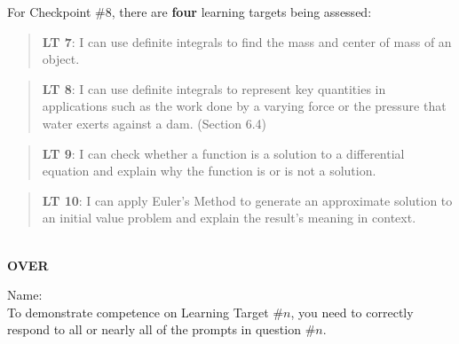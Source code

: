 \documentclass[11 pt]{article}
\begin{document}
 For Checkpoint \#8, there are {\bf four} learning targets being assessed: 

\begin{quote}
{\bf LT 7}: I can use definite integrals to find the mass and center of mass of an object.
\end{quote}

\begin{quote}
{\bf LT 8}: I can use definite integrals to represent key quantities in applications such as the work done by a varying force or the pressure that water exerts against a dam. (Section 6.4)
\end{quote}

\begin{quote}
{\bf LT 9}: I can check whether a function is a solution to a differential equation and explain why the function is or is not a solution.
\end{quote}

\begin{quote}
{\bf LT 10}:  I can apply Euler’s Method to generate an approximate solution to an initial value problem and explain the result’s meaning in context.
\end{quote}


\noindent \hrulefill \\

\vfill \hfill {\bf OVER} 

\pagebreak

\noindent Name: \\ 

\noindent To demonstrate competence on Learning Target \#$n$, you need to correctly respond to all or nearly all of the prompts in question \#$n$.  
\end{document}
